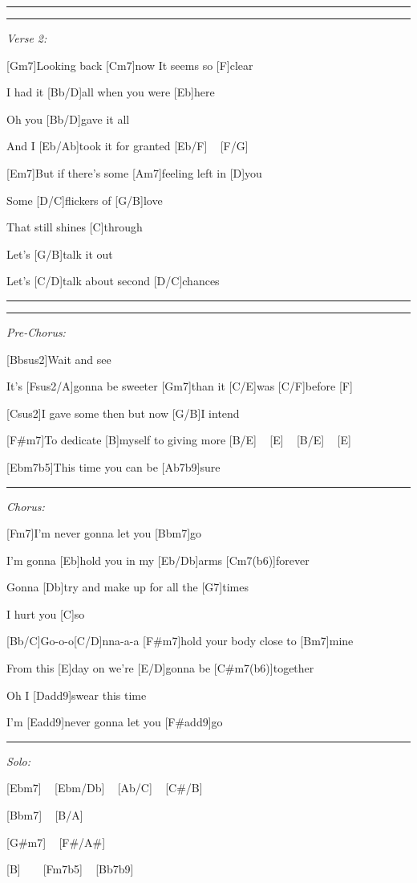 \begin{guitar}
\hrule
\pagebreak
\hrule

\emph{Verse 2:}

[Gm7]Looking back [Cm7]now It seems so [F]clear

I had it [Bb/D]all when you were [Eb]here

Oh you [Bb/D]gave it all

And I [Eb/Ab]took it for granted [Eb/F] ~ [F/G] ~



[Em7]But if there's some [Am7]feeling left in [D]you

Some [D/C]flickers of [G/B]love

That still shines [C]through

Let's [G/B]talk it out

Let's [C/D]talk about second [D/C]chances

\hrule
\pagebreak
\hrule

\emph{Pre-Chorus:}

[Bbsus2]Wait and see

It's [Fsus2/A]gonna be sweeter [Gm7]than it [C/E]was [C/F]before [F] ~

[Csus2]I gave some then but now [G/B]I intend

[F#m7]To dedicate [B]myself to giving more [B/E] ~ [E] ~ [B/E] ~ [E] ~ 

[Ebm7b5]This time you can be [Ab7b9]sure


\hrule

\emph{Chorus:}

[Fm7]I'm never gonna let you [Bbm7]go

I'm gonna [Eb]hold you in my [Eb/Db]arms [Cm7(b6)]forever

Gonna [Db]try and make up for all the [G7]times

I hurt you [C]so

[Bb/C]Go-o-o[C/D]nna-a-a [F#m7]hold your body close to [Bm7]mine

From this [E]day on we're [E/D]gonna be [C#m7(b6)]together

Oh I [Dadd9]swear this time

I'm [Eadd9]never gonna let you [F#add9]go

\hrule

\emph{Solo:}

[Ebm7] ~ [Ebm/Db] ~ [Ab/C] ~ [C#/B]

[Bbm7] ~ [B/A]

[G#m7] ~ [F#/A#]

[B] ~ ~ [Fm7b5] ~ [Bb7b9]


\end{guitar}

